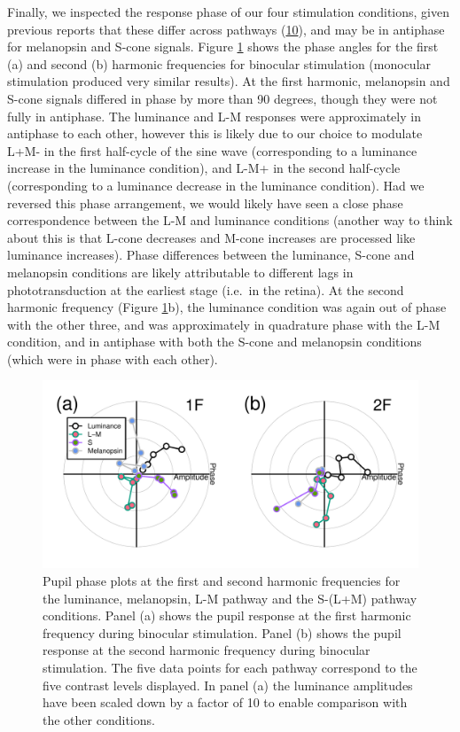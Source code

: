 \documentclass[
]{article}
\begin{document}
Finally, we inspected the response phase of our four stimulation conditions, given previous reports that these differ across pathways (\protect\hyperlink{ref-Spitschan2014}{10}), and may be in antiphase for melanopsin and S-cone signals. Figure \ref{fig:phaseplots} shows the phase angles for the first (a) and second (b) harmonic frequencies for binocular stimulation (monocular stimulation produced very similar results). At the first harmonic, melanopsin and S-cone signals differed in phase by more than 90 degrees, though they were not fully in antiphase. The luminance and L-M responses were approximately in antiphase to each other, however this is likely due to our choice to modulate L+M- in the first half-cycle of the sine wave (corresponding to a luminance increase in the luminance condition), and L-M+ in the second half-cycle (corresponding to a luminance decrease in the luminance condition). Had we reversed this phase arrangement, we would likely have seen a close phase correspondence between the L-M and luminance conditions (another way to think about this is that L-cone decreases and M-cone increases are processed like luminance increases). Phase differences between the luminance, S-cone and melanopsin conditions are likely attributable to different lags in phototransduction at the earliest stage (i.e.~in the retina). At the second harmonic frequency (Figure \ref{fig:phaseplots}b), the luminance condition was again out of phase with the other three, and was approximately in quadrature phase with the L-M condition, and in antiphase with both the S-cone and melanopsin conditions (which were in phase with each other).

\begin{figure}

{\centering \includegraphics{Figures/phaseplots} 

}

\caption{Pupil phase plots at the first and second harmonic frequencies for the luminance, melanopsin, L-M pathway and the S-(L+M) pathway conditions. Panel (a) shows the pupil response at the first harmonic frequency during binocular stimulation. Panel (b) shows the pupil response at the second harmonic frequency during binocular stimulation. The five data points for each pathway correspond to the five contrast levels displayed. In panel (a) the luminance amplitudes have been scaled down by a factor of 10 to enable comparison with the other conditions.}\label{fig:phaseplots}
\end{figure}
\end{document}
